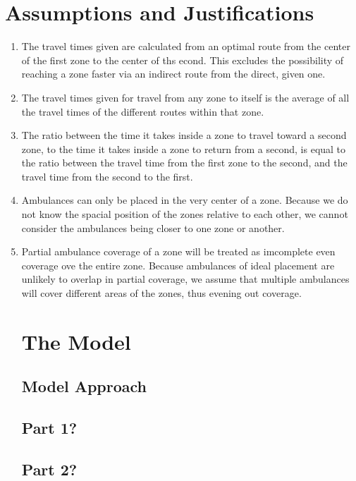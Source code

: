 \documentclass[notitlepage, 12pt]{article}
\begin{document}
\section{Assumptions and Justifications}
\begin{enumerate}
    \item The travel times given are calculated from an optimal route from the center of the first
        zone to the center of ths econd. This excludes the possibility of reaching a zone faster
        via an indirect route from the direct, given one.
    \item The travel times given for travel from any zone to itself is the average
        of all the travel times of the different routes within that zone.
    \item The ratio between the time it takes inside a zone to travel toward a second zone,
        to the time it takes inside a zone to return from a second, is equal to the ratio
        between the travel time from the first zone to the second, and the travel time from the
        second to the first.
    \item
        Ambulances can only be placed in the very center of a zone. Because we do not know the
        spacial position of the zones relative to each other, we cannot consider the ambulances
        being closer to one zone or another.
    \item
       Partial ambulance coverage of a zone will be treated as imcomplete even coverage ove the entire
        zone. Because ambulances of ideal placement are unlikely to overlap in partial coverage, we assume that multiple ambulances will cover different areas of the zones, thus evening out coverage.

\section{The Model}

\subsection{Model Approach}

\subsection{Part 1?}

\subsection{Part 2?}


\end{enumerate}
\end{document}
